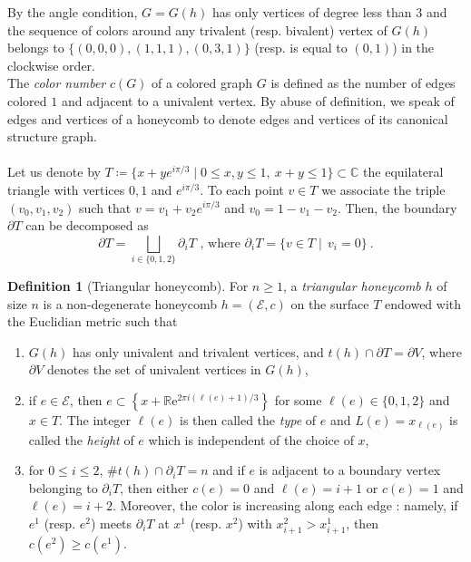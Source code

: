 \documentclass[11pt,a4paper]{amsart}
\providecommand{\ed}{\mathrm e}
\numberwithin{equation}{section}
\theoremstyle{definition}
\newtheorem{definition}[theorem]{Definition}
\begin{document}
\noindent
By the angle condition, $G = G(h)$ has only vertices of degree less than $3$ 
and the sequence of colors around any trivalent 
(resp. bivalent) vertex of $G(h)$ belongs to 
$\{(0,0,0),(1,1,1),(0,3,1)\}$ (resp. is equal to $(0,1)$) 
in the clockwise order. 
\\
The \textit{color number} $c(G)$ of a colored graph $G$ is defined as 
the number of edges 
colored $1$ and adjacent to a univalent vertex. By abuse of definition, we speak of edges and vertices 
of a honeycomb to denote edges and vertices of its 
canonical structure graph. 
\\
\\
Let us denote by 
$T \coloneqq \{x+ye^{i\pi/3} \mid 0\leqslant x,y\leqslant 1, \ x+y\leqslant 1\} 
\subset \mathbb{C}$ the equilateral triangle with vertices $0, 1$ 
and $e^{i\pi/3}$. To each point $v \in T$ we associate the 
triple $(v_0,v_1,v_2)$ such that $v=v_1+v_2e^{i\pi/3}$ 
and $v_0=1-v_1-v_2$.
Then, the boundary $\partial T$ can be decomposed as
$$\partial T=\bigsqcup_{i\in\{0,1,2\}}\partial_iT \text{ , where } 
\partial_iT=\{v\in T \mid \,v_i=0\} \ .$$

\begin{definition}[Triangular honeycomb]
    \label{def:triangular_honey}
    For $n\geqslant 1$, a \textit{triangular honeycomb} $h$ of size $n$ is a non-degenerate 
    honeycomb $h=(\mathcal{E},c)$ on the surface $T$ endowed 
    with the Euclidian metric such that
    \begin{enumerate}
    \item $G(h)$ has only univalent and trivalent vertices, 
    and $t(h)\cap \partial T=\partial V$, where 
    $\partial V$ denotes the set of univalent vertices in $G(h)$,
    \item if $e\in \mathcal{E}$, then $e \subset \left\{x+\mathbb{R} \ed^{2\pi i(\ell(e) +1) / 3}\right\} $ 
    for some $\ell(e)\in\{0,1,2\}$ and $x\in T$. 
    The integer $\ell(e)$ is then called the \textit{type} of $e$ 
    and $L(e)=x_{\ell(e)}$ is called the \textit{height} of $e$ 
    which is independent of the choice of $x$, 
    \item for $0\leqslant i\leqslant 2$, $\#t(h)\cap \partial_i T=n$ and if $e$ 
    is adjacent to a boundary vertex belonging to $\partial_i T$, 
    then either $c(e)=0$ and $\ell(e)=i+1$ or 
    $c(e)=1$ and $\ell(e)=i+2$. Moreover, 
    the color is increasing along each edge : 
    namely, if $e^1$ (resp. $e^2$) meets 
    $\partial_iT$ at $x^1$ (resp. $x^2$) with 
    $x_{i+1}^2>x_{i+1}^1$, then $c(e^2)\geqslant c(e^1)$. 
    \end{enumerate}
\end{definition}
\end{document}
